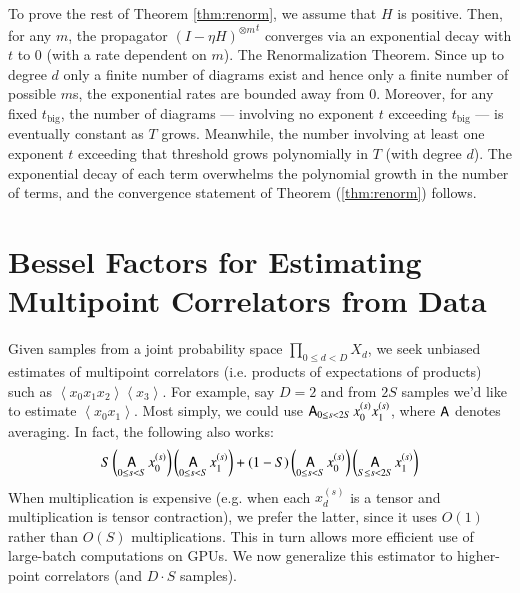 \documentclass{article}
\theoremstyle{plain}
\theoremstyle{definition}
\newcommand{\wrap}[1]{\left(#1\right)}
\newcommand{\wang}[1]{\left\langle#1\right\rangle}
\DeclareMathOperator*{\Avg}{\text{\sffamily A}}
\begin{document}
            To prove the rest of Theorem \ref{thm:renorm}, we assume that $H$
            is positive.  Then, for any $m$, the propagator ${(I-\eta
            H)^{\otimes m}}^t$ converges via an exponential decay with $t$ to
            $0$ (with a rate dependent on $m$).  The Renormalization Theorem.
            Since up to degree $d$ only a finite number of diagrams exist and
            hence only a finite number of possible $m$s, the exponential rates
            are bounded away from $0$.  Moreover, for any fixed
            $t_{\text{big}}$, the number of diagrams --- involving no exponent
            $t$ exceeding  $t_{\text{big}}$ --- is eventually constant as $T$
            grows.  Meanwhile, the number involving at least one exponent $t$
            exceeding that threshold grows polynomially in $T$ (with degree
            $d$).  The exponential decay of each term overwhelms the polynomial
            growth in the number of terms, and the convergence statement of
            Theorem (\ref{thm:renorm}) follows.


\section{Bessel Factors for Estimating Multipoint Correlators from Data}\label{sect:bessel}

    Given samples from a joint probability space $\prod_{0\leq d<D} X_d$, we
    seek unbiased estimates of multipoint correlators (i.e. products of
    expectations of products) such as $\wang{x_0 x_1 x_2}\wang{x_3}$.  For
    example, say $D=2$ and from $2S$ samples we'd like to estimate $\wang{x_0
    x_1}$.  Most simply, we could use $\Avg_{0\leq s<2S} x_0^{(s)} x_1^{(s)}$,
    where $\Avg$ denotes averaging.  In fact, the following also works:
    \begin{equation} \label{eq:bessel}
        S
        \wrap{\Avg_{0\leq s< S} x_0^{(s)}}
        \wrap{\Avg_{0\leq s< S} x_1^{(s)}}
        +
        (1-S)
        \wrap{\Avg_{0\leq s< S} x_0^{(s)}}
        \wrap{\Avg_{S\leq s<2S} x_1^{(s)}}
    \end{equation}
    When multiplication is expensive (e.g. when each $x_d^{(s)}$ is a tensor
    and multiplication is tensor contraction), we prefer the latter, since it
    uses $O(1)$ rather than $O(S)$ multiplications.  This in turn allows more
    efficient use of large-batch computations on GPUs.  We now generalize this
    estimator to higher-point correlators (and $D\cdot S$ samples).
\end{document}
